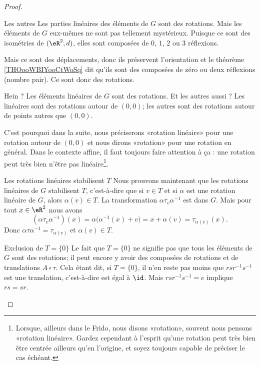 \begin{proof}
\begin{subproof}
		\item[Les autres]
		Les parties linéaires des éléments de \( G\) sont des rotations. Mais les éléments de \( G\) eux-mêmes ne sont pas tellement mystérieux. Puisque ce sont des isométries de \( (\eR^2,d)\), elles sont composées de \( 0\), \( 1\), \( 2\) ou \( 3\) réflexions.

		Mais ce sont des déplacements, donc ils préservent l'orientation et le théorème \ref{THOooWBIYooCtWoSq} dit qu'ils sont des composées de zéro ou deux réflexions (nombre pair). Ce sont donc des rotations.

		\item[Hein ?]
		Les éléments linéaires de \( G\) sont des rotations. Et les autres aussi ? Les linéaires sont des rotations autour de \( (0,0)\); les autres sont des rotations autour de points autres que \( (0,0)\).

		C'est pourquoi dans la suite, nous préciserons «rotation linéaire» pour une rotation autour de \( (0,0)\) et nous dirons «rotation» pour une rotation en général. Dans le contexte affine, il faut toujours faire attention à ça : une rotation peut très bien n'être pas linéaire\footnote{Lorsque, ailleurs dans le Frido, nous disons «rotation», souvent nous pensons «rotation linéaire». Gardez cependant à l'esprit qu'une rotation peut très bien être centrée ailleurs qu'en l'origine, et soyez toujours capable de préciser le cas échéant.}.

		\item[Les rotations linéaires stabilisent \( T\)]
		Nous prouvons maintenant que les rotations linéaires de \( G\) stabilisent \( T\), c'est-à-dire que si \( v\in T\) et si \( \alpha\) est une rotation linéaire de \( G\), alors \( \alpha(v)\in T\). La transformation \( \alpha\tau_v\alpha^{-1}\) est dans \( G\). Mais pour tout \( x\in \eR^2\) nous avons
		\begin{equation}        \label{EQooLLZVooUuabir}
			(\alpha\tau_v\alpha^{-1})(x)=\alpha\big( \alpha^{-1}(x)+v \big)=x+\alpha(v)=\tau_{\alpha(v)}(x).
		\end{equation}
		Donc \( \alpha\tau\alpha^{-1}=\tau_{\alpha(v)}\) et \( \alpha(v)\in T\).

		\item[Exclusion de \( T=\{ 0 \}\)]
		Le fait que \( T=\{ 0 \}\) ne signifie pas que tous les éléments de \( G\) sont des rotations; il peut encore y avoir des composées de rotations et de translations \( A\circ \tau\). Cela étant dit, si \( T=\{ 0 \}\), il n'en reste pas moins que \( rsr^{-1}s^{-1}\) est une translation, c'est-à-dire est égal à \( \id\). Mais \( rsr^{-1}s^{-1}=e\) implique \( rs=sr\).


\end{subproof}
\end{proof}
